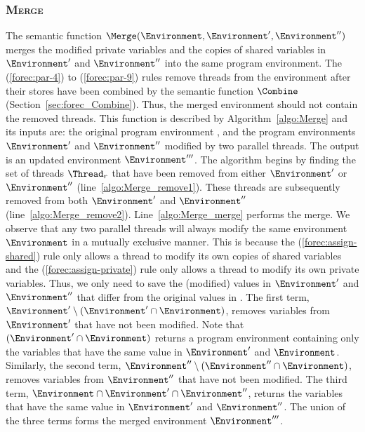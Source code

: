\subsubsection{\textsc{Merge}}
\label{sec:forec_Merge}
The semantic function $\Merge(\Environment, \Environment', \Environment'')$
merges the modified private variables and the copies of shared variables in 
$\Environment'$ and $\Environment''$ into the same program environment. 
The (\ref{forec:par-4}) to (\ref{forec:par-9}) rules remove threads from 
the environment after their stores have been combined by the semantic 
function $\Combine$ (Section~\ref{sec:forec_Combine}). Thus, the merged 
environment should not contain the removed threads. This function is 
described by Algorithm~\ref{algo:Merge} and its inputs 
are: the original program environment \Environment{}, and the 
program environments $\Environment'$ and $\Environment''$ modified 
by two parallel threads. The output is an updated environment 
$\Environment'''$. The algorithm begins by finding the set of threads 
$\Thread_r$ that have been removed from either $\Environment'$ or 
$\Environment''$ (line~\ref{algo:Merge_remove1}). These threads are 
subsequently removed from both $\Environment'$ and $\Environment''$ 
(line~\ref{algo:Merge_remove2}). Line~\ref{algo:Merge_merge} performs 
the merge. We observe that any two parallel threads will always
modify the same environment $\Environment$ in a mutually exclusive
manner. This is because the (\ref{forec:assign-shared}) rule only 
allows a thread to modify its own copies of shared variables and the 
(\ref{forec:assign-private}) rule only allows a thread to modify its 
own private variables. Thus, we only need to save the (modified) 
values in $\Environment'$ and $\Environment''$ that differ from 
the original values in \Environment{}. The first term,
$\Environment' \setminus (\Environment' \cap \Environment)$, removes 
variables from $\Environment'$ that have not been modified. Note that
$(\Environment' \cap \Environment)$ returns a program environment 
containing only the variables that have the same value in $\Environment'$ 
and $\Environment$. Similarly, the second term, 
$\Environment'' \setminus (\Environment'' \cap \Environment)$, removes 
variables from $\Environment''$ that have not been modified. The third
term, $\Environment \cap \Environment' \cap \Environment''$, returns 
the variables that have the same value in $\Environment'$ and 
$\Environment''$. The union of the three terms forms the merged 
environment $\Environment'''$.

